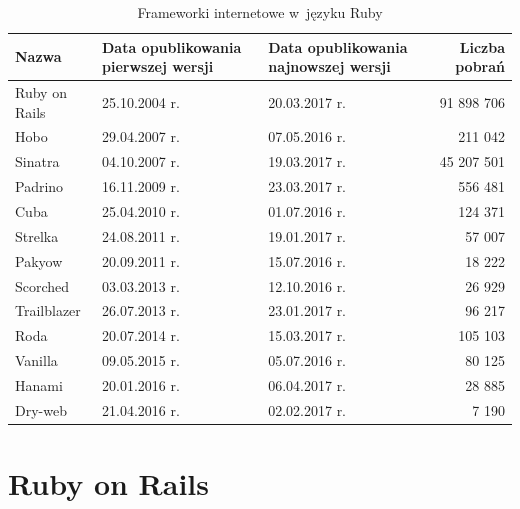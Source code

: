\documentclass[printmode]{mgr}
\begin{document}
\begin{table}[H]
  \caption{ Frameworki internetowe w~języku Ruby \protect\footnotemark}
  \centering
  \begin{tabularx}{1\linewidth}{|X|X|X|r|} \hline
    Nazwa & Data opublikowania \newline pierwszej wersji & Data opublikowania \newline  najnowszej wersji & Liczba pobrań \\ \hline
    \rowcolor{lightgray}
    Ruby on Rails & 25.10.2004 r. & 20.03.2017 r. & 91 898 706 \\ \hline
    Hobo & 29.04.2007 r. & 07.05.2016 r. & 211 042 \\ \hline
    Sinatra & 04.10.2007 r. & 19.03.2017 r. & 45 207 501 \\ \hline
    Padrino & 16.11.2009 r. & 23.03.2017 r. & 556 481 \\ \hline
    Cuba & 25.04.2010 r. & 01.07.2016 r. & 124 371 \\ \hline
    Strelka & 24.08.2011 r. & 19.01.2017 r. & 57 007 \\ \hline
    Pakyow & 20.09.2011 r. & 15.07.2016 r. & 18 222 \\ \Xhline{4\arrayrulewidth}
    Scorched & 03.03.2013 r. & 12.10.2016 r. & 26 929 \\ \hline
    Trailblazer & 26.07.2013 r. & 23.01.2017 r. & 96 217 \\ \hline
    \rowcolor{lightgray}
    Roda & 20.07.2014 r. & 15.03.2017 r. & 105 103 \\ \hline
    Vanilla & 09.05.2015 r. & 05.07.2016 r. & 80 125 \\ \Xhline{4\arrayrulewidth}
    \rowcolor{lightgray}
    Hanami & 20.01.2016 r. & 06.04.2017 r. & 28 885 \\ \hline
    Dry-web & 21.04.2016 r. & 02.02.2017 r. & 7 190 \\ \hline
  \end{tabularx}
\end{table}

\section{Ruby on Rails}
\end{document}
